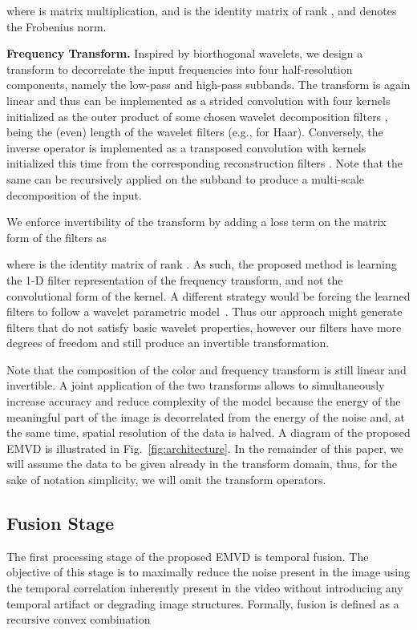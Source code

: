 \documentclass[final]{cvpr}
\begin{document}
    where  is matrix multiplication, and  is the identity matrix of rank , and  denotes the Frobenius norm.
    
    \textbf{Frequency Transform.} Inspired by biorthogonal wavelets, we design a transform  to decorrelate the input frequencies into four half-resolution components, namely the low-pass  and high-pass  subbands. The transform is again linear and thus can be implemented as a strided convolution with four  kernels initialized as the outer product of some chosen wavelet decomposition filters , being  the (even) length of the wavelet filters (e.g.,  for Haar). Conversely, the inverse operator  is implemented as a transposed convolution with kernels initialized this time from the corresponding reconstruction filters . Note that the same  can be recursively applied on the  subband to produce a multi-scale decomposition of the input.

    We enforce invertibility of the transform by adding a loss term on the matrix form of the filters as
    
    where  is the identity matrix of rank . As such, the proposed method is learning the 1-D filter representation of the frequency transform, and not the convolutional form of the kernel. A different strategy would be forcing the learned filters to follow a wavelet parametric model~\cite{wolter2020wavelet}. Thus our approach might generate filters that do not satisfy basic wavelet properties, however our filters have more degrees of freedom and still produce an invertible transformation.
    
    Note that the composition of the color and frequency transform  is still linear and invertible. A joint application of the two transforms allows to simultaneously increase accuracy and reduce complexity of the model because the energy of the meaningful part of the image is decorrelated from the energy of the noise and, at the same time, spatial resolution of the data is halved. A diagram of the proposed EMVD is illustrated in Fig.~\ref{fig:architecture}. In the remainder of this paper, we will assume the data to be given already in the transform domain, thus, for the sake of notation simplicity, we will omit the transform operators.
    
    \subsection{Fusion Stage}
    \label{section:fusion}
    
    The first processing stage of the proposed EMVD is temporal fusion. The objective of this stage is to maximally reduce the noise present in the image using the temporal correlation inherently present in the video without introducing any temporal artifact or degrading image structures. Formally, fusion is defined as a recursive convex combination
    
\end{document}
